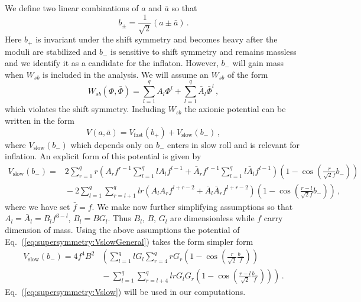 \documentclass[12pt]{article}
\begin{document}
We define two linear combinations of $a$ and $\bar a$ so that
\begin{equation} \label{eq:b+-}
  b_{\pm}= \frac{1}{\sqrt 2} \left(a \pm \bar a\right)\,.
\end{equation}
Here $b_+$ is invariant under the shift symmetry and becomes heavy after the moduli are stabilized and $b_-$ is sensitive to shift symmetry and remains massless and we identify it as a candidate for the inflaton.
However, $b_-$ will gain mass when $W_{sb}$ is included in the analysis.
We will assume an $W_{sb}$ of the form
\begin{equation} \label{eq:supersymmetry:Wsb}
  W_{sb}\left(\Phi, \bar\Phi\right) =
      \sum_{l = 1}^q A_l \Phi^l
    + \sum_{l = 1}^q \bar A_l \bar\Phi^l\,,
\end{equation}
which violates the shift symmetry.
Including $W_{sb}$ the axionic potential can be written in the form
\begin{equation}
  V\left(a, \bar a\right) = V_\text{fast}\left(b_+\right) + V_\text{slow}\left(b_-\right)\,,
\end{equation}
where $V_\text{slow}\left(b_-\right)$ which depends only on $b_-$ enters in slow roll and is relevant for inflation.
An explicit form of this potential is given by
\begin{equation} \label{eq:supersymmetry:VslowGeneral}
  \begin{aligned}
    V_\text{slow}\left(b_-\right) =
      &2 \sum_{r = 1}^q r
        \left(A_r f^{r - 1} \sum_{l = 1}^q l A_l f^{l - 1}
          + \bar A_r f^{r - 1} \sum_{l = 1}^q l \bar A_l f^{l - 1}\right)
        \left(1 - \cos\left(\frac{r}{\sqrt 2 f} b_-\right)\right)\\
      &{} - 2 \sum_{l = 1}^q \sum_{r = l + 1}^q
        l r \left(A_l A_r f^{l + r - 2} + \bar A_l \bar A_r f^{l + r - 2}\right)
        \left(1 - \cos\left(\frac{r - l}{\sqrt 2 f} b_-\right)\right)\,,
  \end{aligned}
\end{equation}
where we have set $\bar f = f$.
We make now further simplifying assumptions so that $A_l = \bar A_l = B_l f^{3 - l}$, $B_l = B G_l$.
Thus $B_l$, $B$, $G_l$ are dimensionless while $f$ carry dimension of mass.
Using the above assumptions the potential of Eq.~(\ref{eq:supersymmetry:VslowGeneral}) takes the form simpler form
\begin{equation} \label{eq:supersymmetry:Vslow}
  \begin{aligned}
    V_\text{slow}\left(b_-\right) = 4 f^4 B^2 &\left(
      \sum_{l = 1}^q l G_l \sum_{r = 4}^q r G_r
        \left(1 - \cos\left(\frac{r}{\sqrt{2}} \frac{b_-}{f}\right)\right)\right. \\
      &\left.{} - \sum_{l = 1}^q \sum_{r = l + 4}^q l r G_l G_r
        \left(1 - \cos\left(\frac{r - l}{\sqrt{2}} \frac{b_-}{f}\right)\right)
    \right)\,.
  \end{aligned}
\end{equation}
Eq.~(\ref{eq:supersymmetry:Vslow}) will be used in our computations.
\end{document}
